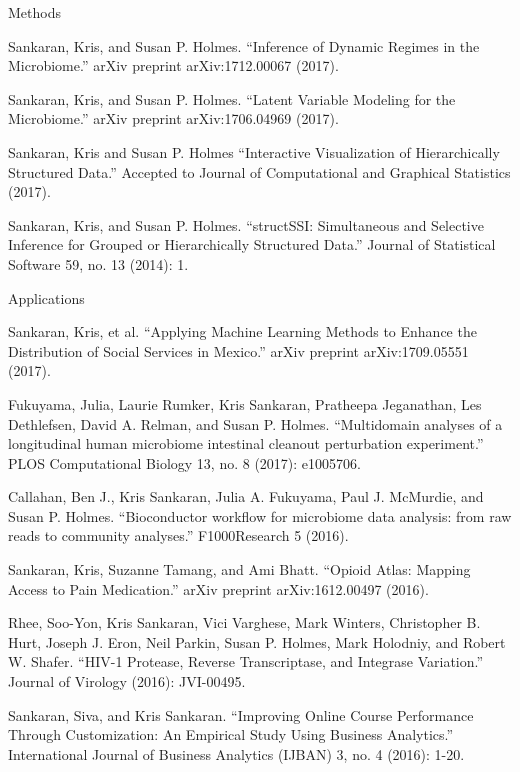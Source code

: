 \documentclass[letterpaper]{article}
\renewenvironment{itemize}{
  \begin{list}{}{
    \setlength{\leftmargin}{1.5em}
  }
}{
  \end{list}
}
\begin{document}
\begin{itemize}
  \item Methods
\begin{itemize}
 \item Sankaran, Kris, and Susan P. Holmes. ``Inference of Dynamic Regimes in
   the Microbiome.'' arXiv preprint arXiv:1712.00067 (2017).
\item Sankaran, Kris, and Susan P. Holmes. ``Latent Variable Modeling for the
  Microbiome.'' arXiv preprint arXiv:1706.04969 (2017).
\item Sankaran, Kris and Susan P. Holmes ``Interactive Visualization of
  Hierarchically Structured Data.'' Accepted to Journal of Computational and
  Graphical Statistics (2017).
\item Sankaran, Kris, and Susan P. Holmes. ``structSSI: Simultaneous and Selective
  Inference for Grouped or Hierarchically Structured Data.'' Journal of
  Statistical Software 59, no. 13 (2014): 1.
\end{itemize}
\item Applications
  \begin{itemize}
  \item Sankaran, Kris, et al. ``Applying Machine Learning Methods to Enhance the
    Distribution of Social Services in Mexico.'' arXiv preprint arXiv:1709.05551
    (2017).
  \item Fukuyama, Julia, Laurie Rumker, Kris Sankaran, Pratheepa Jeganathan, Les
    Dethlefsen, David A. Relman, and Susan P. Holmes. ``Multidomain analyses of a
    longitudinal human microbiome intestinal cleanout perturbation experiment.''
    PLOS Computational Biology 13, no. 8 (2017): e1005706.
  \item Callahan, Ben J., Kris Sankaran, Julia A. Fukuyama, Paul J. McMurdie, and
    Susan P. Holmes. ``Bioconductor workflow for microbiome data analysis: from
    raw reads to community analyses.'' F1000Research 5 (2016).
  \item Sankaran, Kris, Suzanne Tamang, and Ami Bhatt. ``Opioid Atlas: Mapping
    Access to Pain Medication.'' arXiv preprint arXiv:1612.00497 (2016).
  \item Rhee, Soo-Yon, Kris Sankaran, Vici Varghese, Mark Winters, Christopher B.
    Hurt, Joseph J. Eron, Neil Parkin, Susan P. Holmes, Mark Holodniy, and Robert
    W. Shafer. ``HIV-1 Protease, Reverse Transcriptase, and Integrase Variation.''
    Journal of Virology (2016): JVI-00495.
  \item Sankaran, Siva, and Kris Sankaran. ``Improving Online Course Performance
    Through Customization: An Empirical Study Using Business Analytics.''
    International Journal of Business Analytics (IJBAN) 3, no. 4 (2016): 1-20.
  \end{itemize}
\end{itemize}
\end{document}
